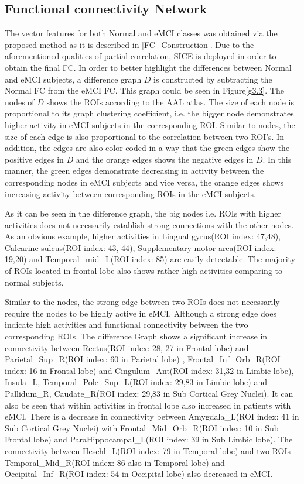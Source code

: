 \documentclass[preprint,12pt]{elsarticle}
\begin{document}
	\subsection{Functional connectivity Network}
	The vector features for both Normal and eMCI classes was obtained via the proposed method as it is described in \eqref{FC_Construction}. Due to the aforementioned qualities of partial correlation, SICE is deployed in order to obtain the final FC.  
	In order to better highlight the differences between Normal and eMCI subjects, a difference graph $D$ is constructed by subtracting the Normal FC from the eMCI FC. This graph could be seen in Figure\eqref{g3.3}. 
	The nodes of $D$ shows the ROIs according to the AAL atlas. The size of each node is proportional to its graph clustering coefficient, i.e. the bigger node demonstrates higher activity in eMCI subjects in the corresponding ROI. 
	Similar to nodes, the size of each edge is also proportional to the correlation between two ROI's. In addition, the edges are also color-coded in a way that the green edges show the positive edges in $D$ and the orange edges shows the negative edges in $D$. In this manner, the green edges demonstrate decreasing in activity between the corresponding nodes in eMCI subjects and vice versa, the orange edges shows increasing activity between corresponding ROIs in the eMCI subjects.   
	
	As it can be seen in the difference graph, the big nodes i.e. ROIs with higher activities does not necessarily establish strong connections with the other nodes. As an obvious example, higher activities in Lingual gyrus(ROI index: 47,48)\cite{r24,r25}, Calcarine sulcus(ROI index: 43, 44)\cite{r26,r27}, Supplementary motor area(ROI index: 19,20)\cite{r27,r28} and Temporal\_mid\_L(ROI index: 85)\cite{r29} are easily detectable. The majority of ROIs located in frontal lobe also shows rather high activities comparing to normal subjects\cite{r30,r04}.
	
	Similar to the nodes, the strong edge between two ROIs does not necessarily require the nodes to be highly active in eMCI. Although a strong edge does indicate high activities and functional connectivity between the two corresponding ROIs. The difference Graph shows a significant increase in connectivity between 
	Rectus(ROI index: 28, 27 in Frontal lobe) and 
	Parietal\_Sup\_R(ROI index: 60 in Parietal lobe) \cite{r40, r41},
	Frontal\_Inf\_Orb\_R(ROI index: 16 in Frontal lobe) and
	Cingulum\_Ant(ROI index: 31,32 in Limbic lobe)\cite{r42},
	Insula\_L, Temporal\_Pole\_Sup\_L(ROI index: 29,83 in Limbic lobe) and
	Pallidum\_R, Caudate\_R(ROI index: 29,83 in Sub Cortical Grey Nuclei)\cite{r43}. It can also be seen that within activities in frontal lobe also increased in patients with eMCI\cite{r44}. There is a decrease in connectivity between Amygdala\_L(ROI index: 41 in Sub Cortical Grey Nuclei) with Frontal\_Mid\_Orb\_R(ROI index: 10 in Sub Frontal lobe) and ParaHippocampal\_L(ROI index: 39 in Sub Limbic lobe)\cite{r45}. The connectivity between Heschl\_L(ROI index: 79 in Temporal lobe) and two ROIs Temporal\_Mid\_R(ROI index: 86 also in Temporal lobe) and Occipital\_Inf\_R(ROI index: 54 in Occipital lobe) also decreased in eMCI\cite{r46}. 
	
\end{document}
